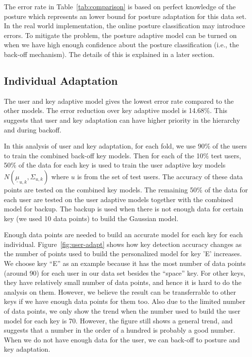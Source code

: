 \documentclass{sigchi}
\begin{document}
The error rate in Table~\ref{tab:comparison} is based on perfect knowledge of
the posture which represents an lower bound for posture adaptation for this data
set. In the real world implementation, the online posture classification may
introduce errors. To mitigate the problem, the posture adaptive model can be turned on
when we have high enough confidence about the posture classification (i.e., the
back-off mechanism). The details of this is explained in a later section.

\subsection{Individual Adaptation}
The user and key adaptive model gives the lowest error rate compared to the
other models. The error reduction over key adaptive model is 14.68\%.
This suggests that user and key adaptation can have higher priority in the hierarchy and during
backoff. 

In this analysis of user and key adaptation, for each fold, we use 90\% of the
users to train the combined back-off key models. Then for each of the 10\% test users,
50\% of the data for each key is used to train the user adaptive
key models $N(\underline \mu_{u, k}, \Sigma_{u, k})$ where $u$ is from the set
of test users.
The accuracy of these data points are tested on the combined key models.
The remaining 50\% of the data for each user are tested on the user adaptive 
models together with the combined model for backup. The backup is used when 
there is not enough data for certain key (we used 10 data points) to build the 
Gaussian model. 

Enough data points are needed to build an accurate model for each key for each
individual.
Figure~\ref{fig:user-adapt} shows how key detection accuracy changes as the number of points used to build
the personalized model for key 'E' increases. We choose key ``E'' as an
example because it has the most number of data points (around 90) for each
user in our data set besides the ``space'' key. For other keys, they have
relatively small number of data points, and hence it is hard to do the
analysis on them. However, we believe the result can be transferrable to other
keys if we have enough data points for them too. Also due to the limited number
of data points, we only show the trend when the number used to build the user
model for each key is 70.
However, the figure still shows a general trend, and suggests that a number in 
the order of a hundred is probably a good number. When we do not have enough 
data for the user, we can back-off to posture and key adaptation.
\end{document}

